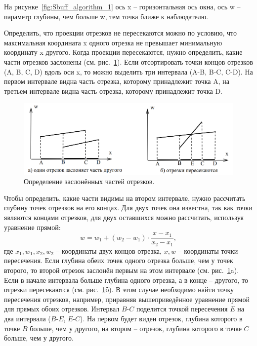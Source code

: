 На рисунке~\ref{fig:Sbuff_algorithm_1} ось x – горизонтальная ось окна, ось w – параметр глубины, чем больше w, тем точка ближе к наблюдателю.

Определить, что проекции отрезков не пересекаются можно по условию, что максимальная координата x одного отрезка не превышает минимальную координату x другого. Когда проекции пересекаются, нужно определить, какие части отрезков заслонены (см. рис.~\ref{fig:Sbuff_algorithm_2}). Если отсортировать точки концов отрезков (A, B, C, D) вдоль оси x, то можно выделить три интервала (A-B, B-C, C-D). На первом интервале видна часть отрезка, которому принадлежит точка A, на третьем интервале видна часть отрезка, которому принадлежит точка D.

\begin{figure}[H]
    \centering
    \includegraphics[width=\textwidth]{img/Sbuff_algorithm_2.png}
    \caption{Определение заслонённых частей отрезков.}
    \label{fig:Sbuff_algorithm_2}
\end{figure}

Чтобы определить, какие части видимы на втором интервале, нужно рассчитать глубину точек отрезков на его концах. Для двух точек она известна, так как точки являются концами отрезков, для двух оставшихся
можно рассчитать, используя уравнение прямой:
\begin{equation}
w = w_1 + (w_2 - w_1) \cdot \frac{x - x_1}{x_2 - x_1},
\end{equation}
где $x_1, w_1, x_2, w_2$ – координаты двух концов отрезка, $x, w$ – координаты точки пересечения. Если глубина обеих точек одного отрезка больше, чем у точек второго, то второй отрезок заслонён первым на этом интервале (см. рис.~\ref{fig:Sbuff_algorithm_2}a). Если в начале интервала больше глубина одного отрезка, а в конце – другого, то отрезки пересекаются (см. рис.~\ref{fig:Sbuff_algorithm_2}б). В этом случае необходимо найти точку пересечения отрезков, например, приравняв вышеприведённое уравнение прямой для прямых обоих отрезков. Интервал $B$-$C$ поделится точкой пересечения $E$ на два интервала ($B$-$E$, $E$-$C$). На первом будет виден отрезок, глубина которого в точке $B$ больше, чем у другого, на втором – отрезок, глубина которого в точке $C$ больше, чем у другого.~\cite{polski}

